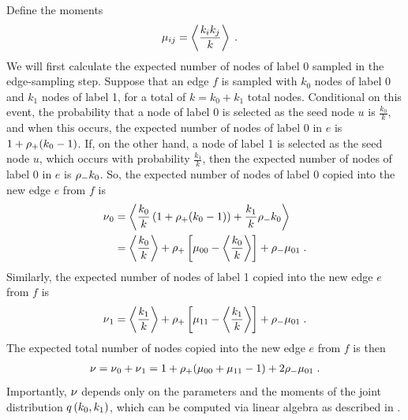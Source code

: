 \documentclass[aps,pre,reprint,superscriptaddress,nofootinbib]{revtex4-2}
\begin{document}
    Define the moments 
    \begin{align}
        \mu_{ij} &= \left\langle \frac{k_i k_j}{k} \right\rangle \;. 
    \end{align}
    We will first calculate the expected number of nodes of label 0 sampled in the edge-sampling step.
    Suppose that an edge $f$ is sampled with $k_0$ nodes of label 0 and $k_1$ nodes of label 1, for a total of $k = k_0 + k_1$ total nodes. 
    Conditional on this event, the probability that a node of label 0 is selected as the seed node $u$ is $\frac{k_0}{k}$, and when this occurs, the expected number of nodes of label 0 in $e$ is $1 + \rho{}_+ (k_0 - 1)$. 
    If, on the other hand, a node of label 1 is selected as the seed node $u$, which occurs with probability $\frac{k_1}{k}$, then the expected number of nodes of label 0 in $e$ is $\rho{}_- k_0$. 
    So, the expected number of nodes of label 0 copied into the new edge $e$ from $f$ is 
    \begin{align}
        \nu{}_0 &= \left\langle \frac{k_0}{k}\left( 1 + \rho{}_+(k_0 - 1) \right) + \frac{k_1}{k} \rho{}_- k_0 \right\rangle \\ 
        &= \left\langle \frac{k_0}{k} \right\rangle + \rho{}_+ \left[ \mu_{00} - \left\langle \frac{k_0}{k} \right\rangle \right] + \rho{}_- \mu_{01}\;. 
    \end{align}
    Similarly, the expected number of nodes of label 1 copied into the new edge $e$ from $f$ is 
    \begin{align}
        \nu{}_1 = \left\langle \frac{k_1}{k} \right\rangle + \rho{}_+ \left[ \mu_{11} - \left\langle \frac{k_1}{k} \right\rangle \right] + \rho{}_- \mu_{01}\;. 
    \end{align}
    The expected total number of nodes copied into the new edge $e$ from $f$ is then
    \begin{align}
        \nu{} = \nu{}_0 + \nu{}_1 = 1 + \rho{}_+(\mu_{00} + \mu_{11} - 1) + 2\rho{}_- \mu_{01}\;.
    \end{align}
    Importantly, $\nu{}$ depends only on the parameters and the moments of the joint distribution $q \left( k_0,k_1 \right)$, which can be computed via linear algebra as described in .
    
\end{document}
